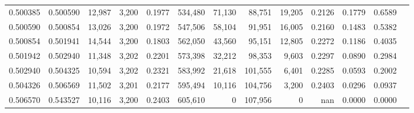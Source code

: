 \begin{tabular}{rrrrrrrrrrrrr}
0.500385 & 0.500590 & 12,987 & 3,200 &                                     0.1977 & 534,480 &  71,130 &  88,751 &  19,205 & 0.2126 & 0.1779 & 0.6589 \\
0.500590 & 0.500854 & 13,026 & 3,200 &                                     0.1972 & 547,506 &  58,104 &  91,951 &  16,005 & 0.2160 & 0.1483 & 0.5382 \\
0.500854 & 0.501941 & 14,544 & 3,200 &                                     0.1803 & 562,050 &  43,560 &  95,151 &  12,805 & 0.2272 & 0.1186 & 0.4035 \\
0.501942 & 0.502940 & 11,348 & 3,202 &                                     0.2201 & 573,398 &  32,212 &  98,353 &   9,603 & 0.2297 & 0.0890 & 0.2984 \\
0.502940 & 0.504325 & 10,594 & 3,202 &                                     0.2321 & 583,992 &  21,618 & 101,555 &   6,401 & 0.2285 & 0.0593 & 0.2002 \\
0.504326 & 0.506569 & 11,502 & 3,201 &                                     0.2177 & 595,494 &  10,116 & 104,756 &   3,200 & 0.2403 & 0.0296 & 0.0937 \\
0.506570 & 0.543527 & 10,116 & 3,200 &                                     0.2403 & 605,610 &       0 & 107,956 &       0 &    nan & 0.0000 & 0.0000 \\
\bottomrule
\end{tabular}
